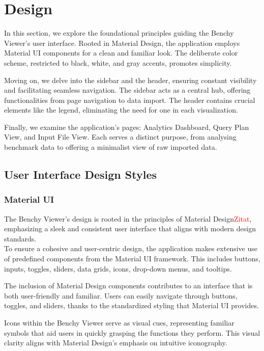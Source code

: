 
\section{Design}
In this section, we explore the foundational principles guiding the Benchy Viewer's user interface. Rooted in Material Design, the application employs Material UI components for a clean and familiar look. The deliberate color scheme, restricted to black, white, and gray accents, promotes simplicity.

Moving on, we delve into the sidebar and the header, ensuring constant visibility and facilitating seamless navigation. The sidebar acts as a central hub, offering functionalities from page navigation to data import. The header contains crucial elements like the legend, eliminating the need for one in each visualization.

Finally, we examine the application's pages: Analytics Dashboard, Query Plan View, and Input File View. Each serves a distinct purpose, from analysing benchmark data to offering a minimalist view of raw imported data. 


\subsection{User Interface Design Styles}
\subsubsection{Material UI}
The Benchy Viewer's design is rooted in the principles of Material Design\textcolor{red}{Zitat}, emphasizing a sleek and consistent user interface that aligns with modern design standards.\\
To ensure a cohesive and user-centric design, the application makes extensive use of predefined components from the Material UI framework. This includes buttons, inputs, toggles, sliders, data grids, icons, drop-down menus, and tooltips.

The inclusion of Material Design components contributes to an interface that is both user-friendly and familiar. Users can easily navigate through buttons, toggles, and sliders, thanks to the standardized styling that Material UI provides.

Icons within the Benchy Viewer serve as visual cues, representing familiar symbols that aid users in quickly grasping the functions they perform. This visual clarity aligns with Material Design's emphasis on intuitive iconography.

